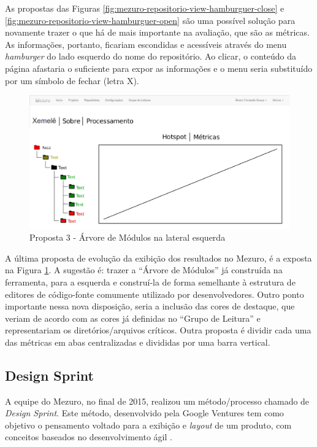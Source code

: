 \newpage

As propostas das Figuras \ref{fig:mezuro-repositorio-view-hamburguer-close} e
\ref{fig:mezuro-repositorio-view-hamburguer-open} são uma possível solução para
novamente trazer o que há de mais importante na avaliação, que são as métricas.
As informações, portanto, ficariam escondidas e acessíveis através do menu
\textit{hamburger} do lado esquerdo do nome do repositório. Ao clicar, o
conteúdo da página afastaria o suficiente para expor as informações e o menu
seria substituído por um símbolo de fechar (letra X).

\begin{figure}[!htb]
	\centering
    \includegraphics[keepaspectratio=true,scale=0.45]
    {figuras/arvore-lateral.eps}
  \caption{Proposta 3 - Árvore de Módulos na lateral esquerda}
  \label{fig:arvore-lateral}
\end{figure}

A última proposta de evolução da exibição dos resultados no Mezuro, é a exposta
na Figura \ref{fig:arvore-lateral}. A sugestão é: trazer a ``Árvore de Módulos''
já construída na ferramenta, para a esquerda e construí-la de forma semelhante
à estrutura de editores de código-fonte comumente utilizado por desenvolvedores.
Outro ponto importante nessa nova disposição, seria a inclusão das cores de
destaque, que veriam de acordo com as cores já definidas no ``Grupo de Leitura''
e representariam os diretórios/arquivos críticos. Outra proposta é dividir cada
uma das métricas em abas centralizadas e divididas por uma barra vertical.

\subsection{Design Sprint}

A equipe do Mezuro, no final de 2015, realizou um método/processo chamado de
\textit{Design Sprint}. Este método, desenvolvido pela Google Ventures tem como
objetivo o pensamento voltado para a exibição e \textit{layout} de um produto,
com conceitos baseados no desenvolvimento ágil \cite{designSprintDoc}.

